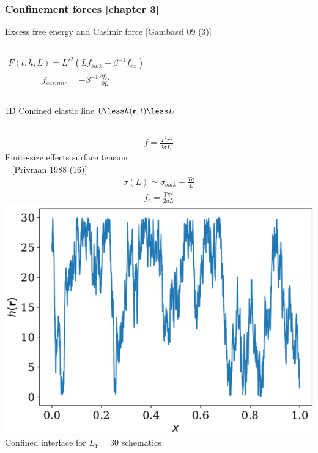 \documentclass[9pt, dvipsnames,aspectratio=169]{beamer} %
\newcommand{\br}{{\bf r}}
\begin{document}
\begin{frame}
    \frametitle{Confinement forces [chapter 3]}
    \begin{block}{Excess free energy and Casimir force [Gambassi 09 (3)]}
    \begin{columns}
		\begin{align}
		F(t,h,L) = L'^2 \left( L f_{bulk} + \beta^{-1} f_{ex} \right)
		\end{align}
		\begin{align}
		 f_{casimir} = - \beta^{-1} \frac{\partial  f_{ex}}{\partial L}
		\end{align}
    \end{columns}
    \end{block}
    \begin{block}{1D Confined elastic line  $0 \less h(\br,t) \less L$}
	\begin{columns}
	    \begin{align}
		   f = \frac{T^2\pi^2}{2\sigma L^2} 
	    \end{align}
	    Finite-size effects surface tension \\ ~ [Privman 1988 (16)] 
	    \begin{align}
	    	\sigma(L) \simeq \sigma_{bulk}+\frac{Ta}{L}
    	\end{align}
	    \begin{align}
	        f_c= \frac{T\pi^2}{2 a L} 
	    \end{align}
	    \centering
	    \includegraphics[width=0.8\linewidth]{interface-confined.pdf}\\
	    {\footnotesize Confined interface for $L_Y=30$ schematics}
	    \end{columns}
	\end{block}
\end{frame}
\end{document}
